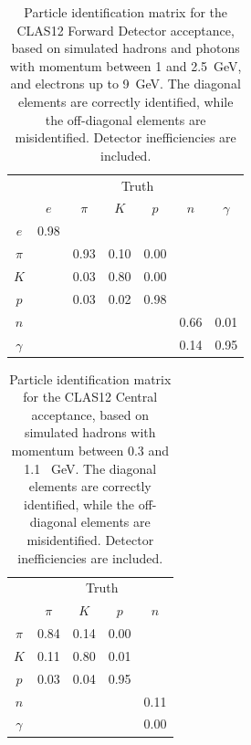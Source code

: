 \begin{table}[htpb]
  \begin{center}
    \begin{tabular}{|c|cccccc|}\hline
          & \multicolumn{6}{c|}{Truth}\\        
          & $e$  & $\pi$ & $K$  & $p$  & $n$  & $\gamma$ \\\hline
  $e$     & 0.98 &       &      &      &      &          \\ 
  $\pi$   &      &  0.93 & 0.10 & 0.00 &      &          \\ 
  $K$     &      &  0.03 & 0.80 & 0.00 &      &          \\ 
  $p$     &      &  0.03 & 0.02 & 0.98 &      &          \\ 
  $n$     &      &       &      &      & 0.66 &   0.01   \\ 
 $\gamma$ &      &       &      &      & 0.14 &   0.95   \\\hline 
    \end{tabular}  
    \caption{Particle identification matrix for the CLAS12 Forward Detector acceptance, based on simulated hadrons
      and photons with momentum between 1 and 2.5~GeV, and electrons up to 9~GeV. The diagonal elements are
      correctly identified, while the off-diagonal elements are misidentified. Detector inefficiencies are included.}
  \label{table:pidmatrix}
  \end{center}
\end{table}

\begin{table}[htpb]
  \begin{center}
    \begin{tabular}{|c|cccc|}\hline
          & \multicolumn{4}{c|}{Truth}\\        
          & $\pi$ & $K$  & $p$  & $n$  \\\hline
  $\pi$   &  0.84 & 0.14 & 0.00 &      \\ 
  $K$     &  0.11 & 0.80 & 0.01 &      \\ 
  $p$     &  0.03 & 0.04 & 0.95 &      \\ 
  $n$     &       &      &      & 0.11 \\ 
 $\gamma$ &       &      &      & 0.00 \\\hline 
    \end{tabular}  
    \caption{Particle identification matrix for the CLAS12 Central acceptance, based on simulated hadrons
      with momentum between 0.3 and 1.1 ~GeV. The diagonal elements are
      correctly identified, while the off-diagonal elements are misidentified. Detector inefficiencies are included.}
  \label{table:pidmatrix}
  \end{center}
\end{table}

